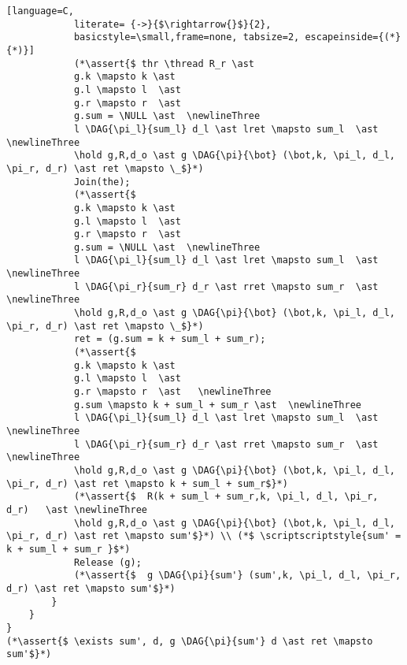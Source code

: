 \documentclass[8pt]{article}
\newcommand{\thread}{\ocircle \hspace{-1ex} \rightarrow}
\newcommand{\hold}{\text{Hold }}
\newcommand{\assert}[1]{\textcolor{blue}{ \{ #1 \}  } }
\newcommand{\NULL}{\text{NULL }}
\newcommand{\newlineThree}{\newline \hphantom{100pt}\hphantom{100pt}}
\newcommand{\DAG}[2]{ \underset{#2}{\overset{#1}{\dag}} }
\begin{document}
\begin{lstlisting}[language=C,
			literate= {->}{$\rightarrow{}$}{2},
			basicstyle=\small,frame=none, tabsize=2, escapeinside={(*}{*)}]
			(*\assert{$ thr \thread R_r \ast
			g.k \mapsto k \ast
			g.l \mapsto l  \ast
			g.r \mapsto r  \ast
			g.sum = \NULL \ast  \newlineThree
			l \DAG{\pi_l}{sum_l} d_l \ast lret \mapsto sum_l  \ast \newlineThree
			\hold g,R,d_o \ast g \DAG{\pi}{\bot} (\bot,k, \pi_l, d_l, \pi_r, d_r) \ast ret \mapsto \_$}*)
			Join(the);
			(*\assert{$ 
			g.k \mapsto k \ast
			g.l \mapsto l  \ast
			g.r \mapsto r  \ast
			g.sum = \NULL \ast  \newlineThree
			l \DAG{\pi_l}{sum_l} d_l \ast lret \mapsto sum_l  \ast \newlineThree
			l \DAG{\pi_r}{sum_r} d_r \ast rret \mapsto sum_r  \ast \newlineThree
			\hold g,R,d_o \ast g \DAG{\pi}{\bot} (\bot,k, \pi_l, d_l, \pi_r, d_r) \ast ret \mapsto \_$}*)
			ret = (g.sum = k + sum_l + sum_r);
			(*\assert{$ 
			g.k \mapsto k \ast
			g.l \mapsto l  \ast
			g.r \mapsto r  \ast   \newlineThree
			g.sum \mapsto k + sum_l + sum_r \ast  \newlineThree
			l \DAG{\pi_l}{sum_l} d_l \ast lret \mapsto sum_l  \ast \newlineThree
			l \DAG{\pi_r}{sum_r} d_r \ast rret \mapsto sum_r  \ast \newlineThree
			\hold g,R,d_o \ast g \DAG{\pi}{\bot} (\bot,k, \pi_l, d_l, \pi_r, d_r) \ast ret \mapsto k + sum_l + sum_r$}*)
			(*\assert{$  R(k + sum_l + sum_r,k, \pi_l, d_l, \pi_r, d_r)   \ast \newlineThree
			\hold g,R,d_o \ast g \DAG{\pi}{\bot} (\bot,k, \pi_l, d_l, \pi_r, d_r) \ast ret \mapsto sum'$}*) \\ (*$ \scriptscriptstyle{sum' = k + sum_l + sum_r }$*)
			Release (g);
			(*\assert{$  g \DAG{\pi}{sum'} (sum',k, \pi_l, d_l, \pi_r, d_r) \ast ret \mapsto sum'$}*)
		}
	}
}		
(*\assert{$ \exists sum', d, g \DAG{\pi}{sum'} d \ast ret \mapsto sum'$}*)

\end{lstlisting}

	
\end{document}
